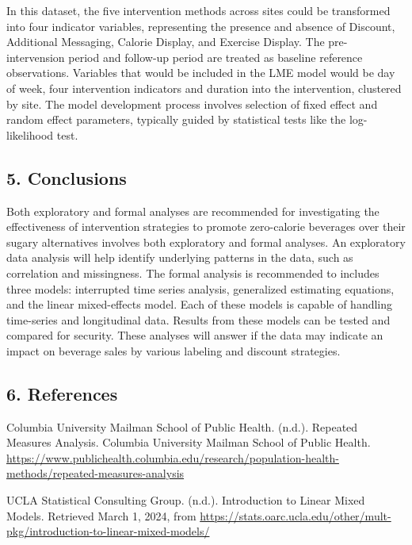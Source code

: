 \documentclass[
]{article}
\begin{document}
In this dataset, the five intervention methods across sites could be
transformed into four indicator variables, representing the presence and
absence of Discount, Additional Messaging, Calorie Display, and Exercise
Display. The pre-intervension period and follow-up period are treated as
baseline reference observations. Variables that would be included in the
LME model would be day of week, four intervention indicators and
duration into the intervention, clustered by site. The model development
process involves selection of fixed effect and random effect parameters,
typically guided by statistical tests like the log-likelihood test.

\hypertarget{conclusions}{%
\subsection{5. Conclusions}\label{conclusions}}

Both exploratory and formal analyses are recommended for investigating
the effectiveness of intervention strategies to promote zero-calorie
beverages over their sugary alternatives involves both exploratory and
formal analyses. An exploratory data analysis will help identify
underlying patterns in the data, such as correlation and missingness.
The formal analysis is recommended to includes three models: interrupted
time series analysis, generalized estimating equations, and the linear
mixed-effects model. Each of these models is capable of handling
time-series and longitudinal data. Results from these models can be
tested and compared for security. These analyses will answer if the data
may indicate an impact on beverage sales by various labeling and
discount strategies.

\pagebreak

\hypertarget{references}{%
\subsection{6. References}\label{references}}

Columbia University Mailman School of Public Health. (n.d.). Repeated
Measures Analysis. Columbia University Mailman School of Public Health.
\url{https://www.publichealth.columbia.edu/research/population-health-methods/repeated-measures-analysis}

UCLA Statistical Consulting Group. (n.d.). Introduction to Linear Mixed
Models. Retrieved March 1, 2024, from
\url{https://stats.oarc.ucla.edu/other/mult-pkg/introduction-to-linear-mixed-models/}
\end{document}

